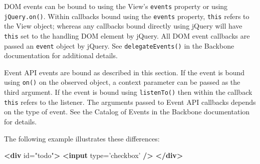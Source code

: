 \documentclass[9pt]{book}
\newenvironment{Shaded}{}{}
\newcommand{\KeywordTok}[1]{\textcolor[rgb]{0.00,0.44,0.13}{\textbf{{#1}}}}
\newcommand{\StringTok}[1]{\textcolor[rgb]{0.25,0.44,0.63}{{#1}}}
\newcommand{\OtherTok}[1]{\textcolor[rgb]{0.00,0.44,0.13}{{#1}}}
\begin{document}
DOM events can be bound to using the View's \texttt{events} property or
using \texttt{jQuery.on()}. Within callbacks bound using the
\texttt{events} property, \texttt{this} refers to the View object;
whereas any callbacks bound directly using jQuery will have
\texttt{this} set to the handling DOM element by jQuery. All DOM event
callbacks are passed an \texttt{event} object by jQuery. See
\texttt{delegateEvents()} in the Backbone documentation for additional
details.

Event API events are bound as described in this section. If the event is
bound using \texttt{on()} on the observed object, a context parameter
can be passed as the third argument. If the event is bound using
\texttt{listenTo()} then within the callback \texttt{this} refers to the
listener. The arguments passed to Event API callbacks depends on the
type of event. See the Catalog of Events in the Backbone documentation
for details.

The following example illustrates these differences:

\begin{Shaded}
\begin{Highlighting}[]
\KeywordTok{<div}\OtherTok{ id=}\StringTok{"todo"}\KeywordTok{>}
    \KeywordTok{<input}\OtherTok{ type=}\StringTok{'checkbox'} \KeywordTok{/>}
\KeywordTok{</div>}
\end{Highlighting}
\end{Shaded}
\end{document}
